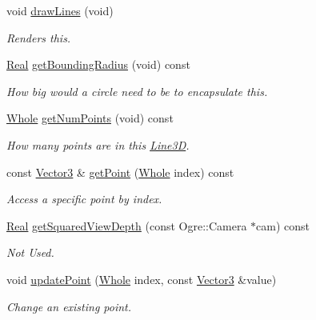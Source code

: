 \begin{DoxyCompactItemize}
void \hyperlink{classMezzanine_1_1internal_1_1Line3D_a08ef83b2655025a9475340db5f092c39}{drawLines} (void)
\begin{DoxyCompactList}\small\item\em Renders this. \item\end{DoxyCompactList}\item 
\hyperlink{namespaceMezzanine_a726731b1a7df72bf3583e4a97282c6f6}{Real} \hyperlink{classMezzanine_1_1internal_1_1Line3D_a36e2a02fdd3c4cba33c6c5dc6c4a2c37}{getBoundingRadius} (void) const 
\begin{DoxyCompactList}\small\item\em How big would a circle need to be to encapsulate this. \item\end{DoxyCompactList}\item 
\hyperlink{namespaceMezzanine_adcbb6ce6d1eb4379d109e51171e2e493}{Whole} \hyperlink{classMezzanine_1_1internal_1_1Line3D_a646e172f64f5563022f05ba5aa3839f9}{getNumPoints} (void) const 
\begin{DoxyCompactList}\small\item\em How many points are in this \hyperlink{classMezzanine_1_1internal_1_1Line3D}{Line3D}. \item\end{DoxyCompactList}\item 
const \hyperlink{classMezzanine_1_1Vector3}{Vector3} \& \hyperlink{classMezzanine_1_1internal_1_1Line3D_a560292248853b723f9f480205bc0a35f}{getPoint} (\hyperlink{namespaceMezzanine_adcbb6ce6d1eb4379d109e51171e2e493}{Whole} index) const 
\begin{DoxyCompactList}\small\item\em Access a specific point by index. \item\end{DoxyCompactList}\item 
\hyperlink{namespaceMezzanine_a726731b1a7df72bf3583e4a97282c6f6}{Real} \hyperlink{classMezzanine_1_1internal_1_1Line3D_a1ead55e5f68b2bb2421af64b1ce2a83e}{getSquaredViewDepth} (const Ogre::Camera $\ast$cam) const 
\begin{DoxyCompactList}\small\item\em Not Used. \item\end{DoxyCompactList}\item 
void \hyperlink{classMezzanine_1_1internal_1_1Line3D_ad2abff4e6297613e3a116c8f3f931442}{updatePoint} (\hyperlink{namespaceMezzanine_adcbb6ce6d1eb4379d109e51171e2e493}{Whole} index, const \hyperlink{classMezzanine_1_1Vector3}{Vector3} \&value)
\begin{DoxyCompactList}\small\item\em Change an existing point. \item\end{DoxyCompactList}\end{DoxyCompactItemize}
